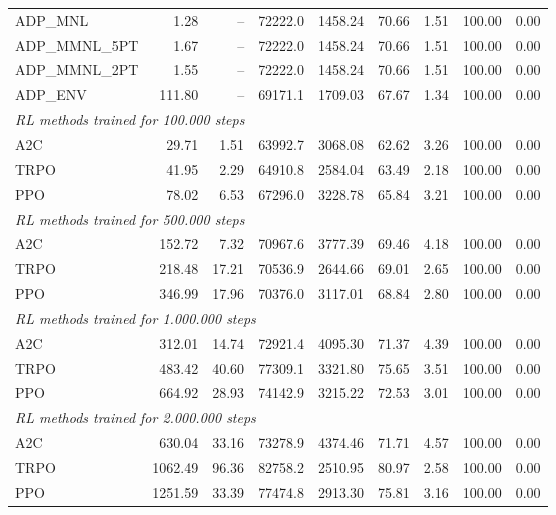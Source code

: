 \begin{samepage}
\begin{center}
\begin{tabular}{l|rr|rr|rr|rr}
    \midrule
    ADP\_MNL     &     1.28 &    -- &    72222.0 &    1458.24 &   70.66 &    1.51 &  100.00 &    0.00 \\
    ADP\_MMNL\_5PT &     1.67 &    -- &    72222.0 &    1458.24 &   70.66 &    1.51 &  100.00 &    0.00 \\
    ADP\_MMNL\_2PT &     1.55 &    -- &    72222.0 &    1458.24 &   70.66 &    1.51 &  100.00 &    0.00 \\
    ADP\_ENV     &   111.80 &    -- &    69171.1 &    1709.03 &   67.67 &    1.34 &  100.00 &    0.00 \\
    \midrule
    \multicolumn{9}{l}{\textit{RL methods trained for 100.000 steps}} \\
    \midrule
    A2C          &    29.71 &     1.51 &    63992.7 &    3068.08 &   62.62 &    3.26 &  100.00 &    0.00 \\
    TRPO         &    41.95 &     2.29 &    64910.8 &    2584.04 &   63.49 &    2.18 &  100.00 &    0.00 \\
    PPO          &    78.02 &     6.53 &    67296.0 &    3228.78 &   65.84 &    3.21 &  100.00 &    0.00 \\
    \midrule
    \multicolumn{9}{l}{\textit{RL methods trained for 500.000 steps}} \\
    \midrule
    A2C          &   152.72 &     7.32 &    70967.6 &    3777.39 &   69.46 &    4.18 &  100.00 &    0.00 \\
    TRPO         &   218.48 &    17.21 &    70536.9 &    2644.66 &   69.01 &    2.65 &  100.00 &    0.00 \\
    PPO          &   346.99 &    17.96 &    70376.0 &    3117.01 &   68.84 &    2.80 &  100.00 &    0.00 \\
    \midrule
    \multicolumn{9}{l}{\textit{RL methods trained for 1.000.000 steps}} \\
    \midrule
    A2C          &   312.01 &    14.74 &    72921.4 &    4095.30 &   71.37 &    4.39 &  100.00 &    0.00 \\
    TRPO         &   483.42 &    40.60 &    77309.1 &    3321.80 &   75.65 &    3.51 &  100.00 &    0.00 \\
    PPO          &   664.92 &    28.93 &    74142.9 &    3215.22 &   72.53 &    3.01 &  100.00 &    0.00 \\
    \midrule
    \multicolumn{9}{l}{\textit{RL methods trained for 2.000.000 steps}} \\
    \midrule
    A2C          &   630.04 &    33.16 &    73278.9 &    4374.46 &   71.71 &    4.57 &  100.00 &    0.00 \\
    TRPO         &  1062.49 &    96.36 &    82758.2 &    2510.95 &   80.97 &    2.58 &  100.00 &    0.00 \\
    PPO          &  1251.59 &    33.39 &    77474.8 &    2913.30 &   75.81 &    3.16 &  100.00 &    0.00 \\
    \bottomrule
  \end{tabular}
\end{center}
\end{samepage}

